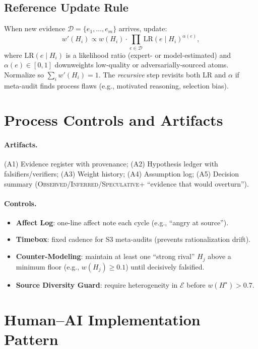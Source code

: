 \documentclass[11pt]{article}
\newcommand{\Obs}{\textsc{Observed}}
\newcommand{\Inf}{\textsc{Inferred}}
\newcommand{\Spec}{\textsc{Speculative}}
\newcommand{\Evid}{\mathcal{E}}
\newcommand{\D}{\mathcal{D}}
\newcommand{\lr}{\mathrm{LR}}
\begin{document}
\subsection{Reference Update Rule}
When new evidence $\D = \{e_1,\dots,e_m\}$ arrives, update:
\begin{equation}
  w'(H_i) \propto w(H_i)\cdot \prod_{e \in \D} \lr(e \mid H_i)^{\alpha(e)},
  \label{eq:update}
\end{equation}
where $\lr(e \mid H_i)$ is a likelihood ratio (expert- or model-estimated) and $\alpha(e)\in[0,1]$ downweights low-quality or adversarially-sourced atoms. Normalize so $\sum_i w'(H_i)=1$. The \emph{recursive} step revisits both $\lr$ and $\alpha$ if meta-audit finds process flaws (e.g., motivated reasoning, selection bias).

\section{Process Controls and Artifacts}
\paragraph{Artifacts.} (A1) Evidence register with provenance; (A2) Hypothesis ledger with falsifiers/verifiers; (A3) Weight history; (A4) Assumption log; (A5) Decision summary (\Obs/\Inf/\Spec + ``evidence that would overturn'').

\paragraph{Controls.}
\begin{itemize}
  \item \textbf{Affect Log}: one-line affect note each cycle (e.g., ``angry at source'').
  \item \textbf{Timebox}: fixed cadence for S3 meta-audits (prevents rationalization drift).
  \item \textbf{Counter-Modeling}: maintain at least one ``strong rival'' $H_j$ above a minimum floor (e.g., $w(H_j)\ge 0.1$) until decisively falsified.
  \item \textbf{Source Diversity Guard}: require heterogeneity in $\Evid$ before $w(H^\star)\!>\!0.7$.
\end{itemize}

\section{Human--AI Implementation Pattern}
\end{document}
